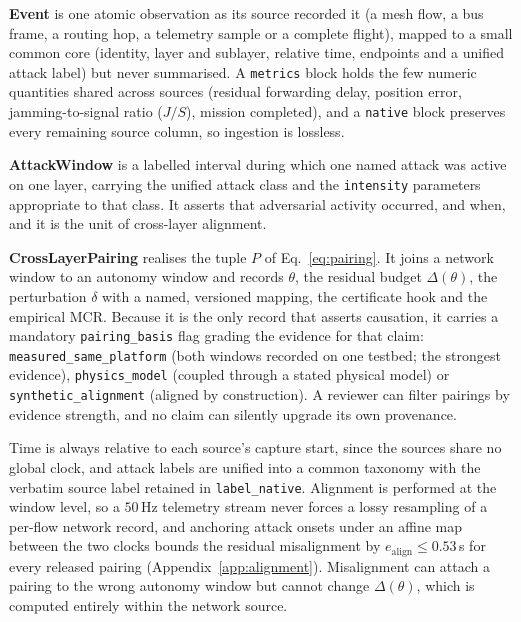 \documentclass[conference,letterpaper,10pt]{IEEEtran}   %
\newcommand{\code}[1]{\texttt{#1}}
\begin{document}
\textbf{Event} is one atomic observation as its source recorded it (a mesh
flow, a bus frame, a routing hop, a telemetry sample or a complete flight),
mapped to a small common core (identity, layer and sublayer, relative time,
endpoints and a unified attack label) but never summarised. A \code{metrics}
block holds the few numeric quantities shared across sources (residual
forwarding delay, position error, jamming-to-signal ratio ($J/S$), mission
completed), and a
\code{native} block preserves every remaining source column, so ingestion is
lossless.

\textbf{AttackWindow} is a labelled interval during which one named attack was
active on one layer, carrying the unified attack class and the
\code{intensity} parameters appropriate to that class. It asserts that
adversarial activity occurred, and when, and it is the unit of cross-layer
alignment.

\textbf{CrossLayerPairing} realises the tuple $P$ of Eq.~\eqref{eq:pairing}. It
joins a network window to an autonomy window and records $\theta$, the residual
budget $\Delta(\theta)$, the perturbation $\delta$ with a named, versioned
mapping, the certificate hook and the empirical MCR. Because it is the only
record that asserts causation, it carries a mandatory \code{pairing\_basis}
flag grading the evidence for that claim: \code{measured\_same\_platform} (both
windows recorded on one testbed; the strongest evidence), \code{physics\_model}
(coupled through a stated physical model) or \code{synthetic\_alignment}
(aligned by construction). A reviewer can filter pairings by evidence
strength, and no claim can silently upgrade its own provenance.

Time is always relative to each source's capture start, since the sources share
no global clock, and attack labels are unified into a common taxonomy with the
verbatim source label retained in \code{label\_native}. Alignment is performed
at the window level, so a $50$\,Hz telemetry stream never forces a lossy
resampling of a per-flow network record, and anchoring attack onsets under an
affine map between the two clocks bounds the residual misalignment by
$e_{\mathrm{align}}\le0.53$\,s for every released pairing
(Appendix~\ref{app:alignment}). 
Misalignment can attach a pairing to the wrong
autonomy window but cannot change $\Delta(\theta)$, which is computed entirely
within the network source.
\end{document}
